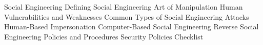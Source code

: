 Social Engineering
	Defining Social Engineering
	Art of Manipulation
	Human Vulnerabilities and Weaknesses
	Common Types of Social Engineering Attacks
	Human-Based Impersonation
	Computer-Based Social Engineering
	Reverse Social Engineering
	Policies and Procedures
	Security Policies Checklist